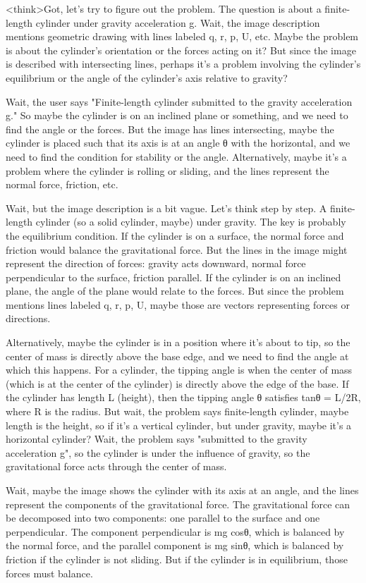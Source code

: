 <think>Got, let's try to figure out the problem. The question is about a finite-length cylinder under gravity acceleration g. Wait, the image description mentions geometric drawing with lines labeled q, r, p, U, etc. Maybe the problem is about the cylinder's orientation or the forces acting on it? But since the image is described with intersecting lines, perhaps it's a problem involving the cylinder's equilibrium or the angle of the cylinder's axis relative to gravity?

Wait, the user says "Finite-length cylinder submitted to the gravity acceleration g." So maybe the cylinder is on an inclined plane or something, and we need to find the angle or the forces. But the image has lines intersecting, maybe the cylinder is placed such that its axis is at an angle θ with the horizontal, and we need to find the condition for stability or the angle. Alternatively, maybe it's a problem where the cylinder is rolling or sliding, and the lines represent the normal force, friction, etc.

Wait, but the image description is a bit vague. Let's think step by step. A finite-length cylinder (so a solid cylinder, maybe) under gravity. The key is probably the equilibrium condition. If the cylinder is on a surface, the normal force and friction would balance the gravitational force. But the lines in the image might represent the direction of forces: gravity acts downward, normal force perpendicular to the surface, friction parallel. If the cylinder is on an inclined plane, the angle of the plane would relate to the forces. But since the problem mentions lines labeled q, r, p, U, maybe those are vectors representing forces or directions.

Alternatively, maybe the cylinder is in a position where it's about to tip, so the center of mass is directly above the base edge, and we need to find the angle at which this happens. For a cylinder, the tipping angle is when the center of mass (which is at the center of the cylinder) is directly above the edge of the base. If the cylinder has length L (height), then the tipping angle θ satisfies tanθ = L/2R, where R is the radius. But wait, the problem says finite-length cylinder, maybe length is the height, so if it's a vertical cylinder, but under gravity, maybe it's a horizontal cylinder? Wait, the problem says "submitted to the gravity acceleration g", so the cylinder is under the influence of gravity, so the gravitational force acts through the center of mass.

Wait, maybe the image shows the cylinder with its axis at an angle, and the lines represent the components of the gravitational force. The gravitational force can be decomposed into two components: one parallel to the surface and one perpendicular. The component perpendicular is mg cosθ, which is balanced by the normal force, and the parallel component is mg sinθ, which is balanced by friction if the cylinder is not sliding. But if the cylinder is in equilibrium, those forces must balance.

